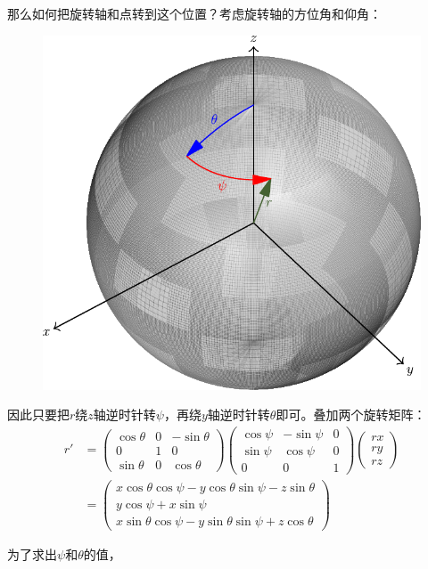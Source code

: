 \documentclass[UTF8,12pt]{ctexart}
\begin{document}
那么如何把旋转轴和点转到这个位置？考虑旋转轴的方位角和仰角：
\begin{figure}[H]
    \centering
    \includegraphics{SphericalSystem.pdf}
\end{figure}
因此只要把$r$绕$z$轴逆时针转$\psi$，再绕$y$轴逆时针转$\theta$即可。叠加两个旋转矩阵：
\begin{equation*}
    \begin{aligned}
        r'&=\begin{pmatrix}\cos\theta&0&-\sin\theta\\0&1&0\\\sin\theta&0&\cos\theta\end{pmatrix}\begin{pmatrix}\cos\psi&-\sin\psi&0\\\sin\psi&\cos\psi&0\\0&0&1\end{pmatrix}\begin{pmatrix}rx\\ry\\rz\end{pmatrix}\\
        &=\begin{pmatrix}x\cos\theta\cos\psi-y\cos\theta\sin\psi-z\sin\theta\\y\cos\psi+x\sin\psi\\x\sin\theta\cos\psi-y\sin\theta\sin\psi+z\cos\theta\end{pmatrix}
    \end{aligned}
\end{equation*}

为了求出$\psi$和$\theta$的值，


\end{document}
